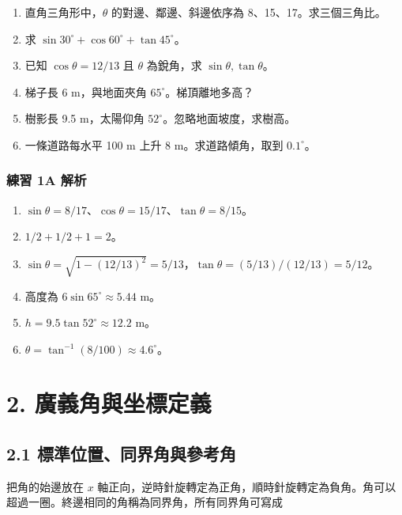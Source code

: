\documentclass[11pt,a4paper]{article}
\providecommand{\tightlist}{%
  \setlength{\itemsep}{0pt}\setlength{\parskip}{0pt}}
\begin{document}
\begin{enumerate}
\def\labelenumi{\arabic{enumi}.}
\tightlist
\item
  直角三角形中，\(\theta\) 的對邊、鄰邊、斜邊依序為 8、15、17。求三個三角比。
\item
  求 \(\sin30^\circ+\cos60^\circ+\tan45^\circ\)。
\item
  已知 \(\cos\theta=12/13\) 且 \(\theta\) 為銳角，求 \(\sin\theta,\tan\theta\)。
\item
  梯子長 6 m，與地面夾角 \(65^\circ\)。梯頂離地多高？
\item
  樹影長 9.5 m，太陽仰角 \(52^\circ\)。忽略地面坡度，求樹高。
\item
  一條道路每水平 100 m 上升 8 m。求道路傾角，取到 \(0.1^\circ\)。
\end{enumerate}

\subsubsection{練習 1A 解析}\label{ux7df4ux7fd2-1a-ux89e3ux6790}

\begin{enumerate}
\def\labelenumi{\arabic{enumi}.}
\tightlist
\item
  \(\sin\theta=\boxed{8/17}\)、\(\cos\theta=\boxed{15/17}\)、\(\tan\theta=\boxed{8/15}\)。
\item
  \(1/2+1/2+1=\boxed{2}\)。
\item
  \(\sin\theta=\sqrt{1-(12/13)^2}=\boxed{5/13}\)，\(\tan\theta=(5/13)/(12/13)=\boxed{5/12}\)。
\item
  高度為 \(6\sin65^\circ\approx\boxed{5.44\text{ m}}\)。
\item
  \(h=9.5\tan52^\circ\approx\boxed{12.2\text{ m}}\)。
\item
  \(\theta=\tan^{-1}(8/100)\approx\boxed{4.6^\circ}\)。
\end{enumerate}

\section{2. 廣義角與坐標定義}\label{ux5ee3ux7fa9ux89d2ux8207ux5750ux6a19ux5b9aux7fa9}

\subsection{2.1 標準位置、同界角與參考角}\label{ux6a19ux6e96ux4f4dux7f6eux540cux754cux89d2ux8207ux53c3ux8003ux89d2}

把角的始邊放在 \(x\) 軸正向，逆時針旋轉定為正角，順時針旋轉定為負角。角可以超過一圈。終邊相同的角稱為同界角，所有同界角可寫成
\end{document}
